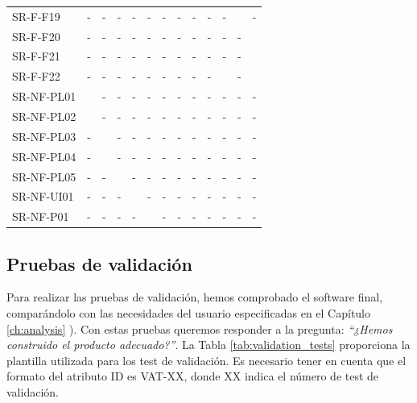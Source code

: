 \begin{table}[htb]
\begin{tabular}{@{}L{3cm}C{0.7cm}C{0.7cm}C{0.7cm}C{0.7cm}C{0.7cm}C{0.7cm}C{0.7cm}C{0.7cm}C{0.7cm}C{0.7cm}C{0.7cm}C{0.7cm}@{}}
    SR-F-F19 & - & - & - & - & - & - & - & - & - & - &  & - \\
    SR-F-F20 & - & - & - & - & - & - & - & - & - & - & - &  \\
    SR-F-F21 & - & - & - & - & - & - & - & - & - & - & - &  \\
    SR-F-F22 & - & - & - & - & - & - & - & - & - &  & - &  \\
    SR-NF-PL01 &  & - & - & - & - & - & - & - & - & - & - & - \\
    SR-NF-PL02 &  & - & - & - & - & - & - & - & - & - & - & - \\
    SR-NF-PL03 & - &  & - & - & - & - & - & - & - & - & - & - \\
    SR-NF-PL04 & - &  & - & - & - & - & - & - & - & - & - & - \\
    SR-NF-PL05 & - & - &  & - & - & - & - & - & - & - & - & - \\
    SR-NF-UI01 & - & - & - &  & - & - & - & - & - & - & - & - \\
    SR-NF-P01 & - & - & - & - &  & - & - & - & - & - & - & - \\
    \bottomrule
\end{tabular}
\label{tab:verification_matrix}
\end{table}    

\clearpage

\subsection{Pruebas de validación}


Para realizar las pruebas de validación, hemos comprobado el \gls{software} final, comparándolo con las necesidades del usuario especificadas en el Capítulo \ref{ch:analysis} \textit{}). Con estas pruebas queremos responder a la pregunta: \emph{``¿Hemos construido el producto adecuado?''}. La Tabla \ref{tab:validation_tests} proporciona la plantilla utilizada para los test de validación. Es necesario tener en cuenta que el formato del atributo ID es VAT-XX, donde XX indica el número de test de validación.


